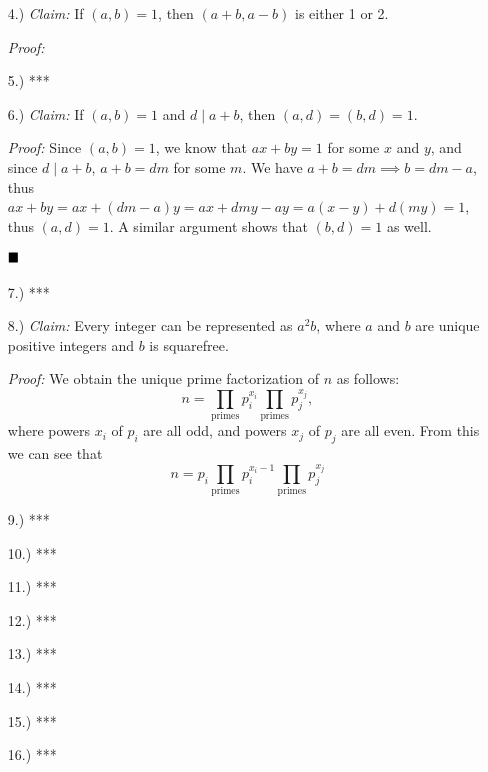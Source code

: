 \documentclass[12pt]{article}
\newcommand{\claim}{\textit{Claim: }}
\newcommand{\proof}{\textit{Proof: }}
\newcommand{\done}{
    \ensuremath{\strut\hfill\blacksquare}
}
\begin{document}
\begin{itemize}
        \item [4.)] \claim If $(a,b) = 1$, then $(a + b, a - b)$ is either 1
        or 2.

        \proof 

        \item [5.)] ***

        \item [6.)] \claim If $(a,b) = 1$ and $d \mid a + b$, then
        $(a,d) = (b,d) = 1$.

        \proof Since $(a,b) = 1$, we know that $ax + by = 1$ for some $x$ and
        $y$, and since $d \mid a + b$, $a + b = dm$ for some $m$.
        We have $a + b = dm \implies b = dm - a$, thus
        $ax+by=ax + (dm - a)y = ax + dmy - ay = a(x-y)+d(my)=1$,
        thus $(a,d) = 1$.
        A similar argument shows that $(b,d) = 1$ as well.
        \done

        \item [7.)] ***

        \item [8.)] \claim Every integer can be represented as $a^2b$, where
        $a$ and $b$ are unique positive integers and $b$ is squarefree.

        \proof We obtain the unique prime factorization of $n$ as follows:
        \[
            n
            = \prod_{\text{primes}} p_i^{x_i} \prod_{\text{primes}} p_j^{x_j}
            ,
        \]
        where powers $x_i$ of $p_i$ are all odd, and powers $x_j$ of $p_j$
        are all even.
        From this we can see that
        \[
            n
            = p_i \prod_{\text{primes}} p_i^{x_i - 1}
            \prod_{\text{primes}} p_j^{x_j}
        \]
        

        \item [9.)] ***

        \item [10.)] ***

        \item [11.)] ***

        \item [12.)] ***

        \item [13.)] ***

        \item [14.)] ***

        \item [15.)] ***

        \item [16.)] ***


\end{itemize}
\end{document}
